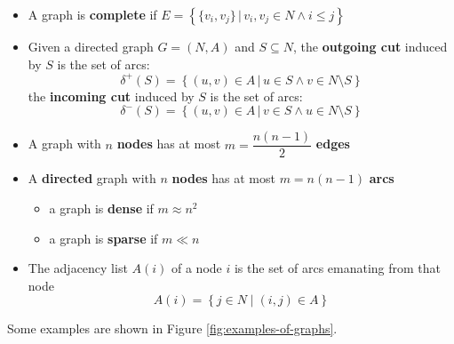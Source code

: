 \documentclass[english]{article}
\begin{document}
\begin{itemize}
  \item A graph is \textbf{complete} if \(E = \left\{\{v_i, v_j\} \,|\, v_i, v_j \in N \land i \leq j \right\}\)
  \item Given a directed graph \(G = (N, A)\) and \(S \subseteq N\), the \textbf{outgoing cut} induced by \(S\) is the set of arcs:
        \[\delta^+(S) = \left\{ (u, v) \in A \,|\, u \in S \land v \in N \setminus S \right\}\]
        the \textbf{incoming cut} induced by \(S\) is the set of arcs:
        \[\delta^-(S) = \left\{ (u, v) \in A \,|\, v \in S \land u \in N \setminus S \right\}\]
  \item A graph with \(n\) \textbf{nodes} has at most \(m = \dfrac{n(n-1)}{2}\) \textbf{edges}
  \item A \textbf{directed} graph with \(n\) \textbf{nodes} has at most \(m = n(n-1)\) \textbf{arcs}
        \begin{itemize}
          \item a graph is \textbf{dense} if \(m \approx n^2\)
          \item a graph is \textbf{sparse} if \(m \ll n\)
        \end{itemize}
  \item The adjacency list \(A(i)\) of a node \(i\) is the set of arcs emanating from that node
        \[ A(i) = \left\{ j \in N \mid   (i, j) \in A  \right\} \]
\end{itemize}

\bigskip
Some examples are shown in Figure \ref{fig:examples-of-graphs}.
\end{document}
